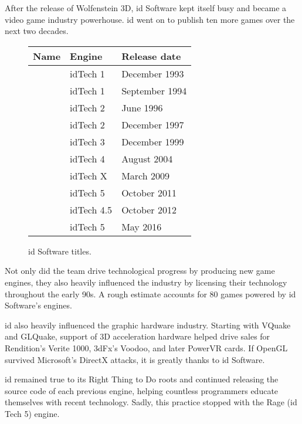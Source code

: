 After the release of Wolfenstein 3D, id Software kept itself busy and became a video game industry powerhouse. id went on to publish ten more games over the next two decades. 
 \begin{figure}[H]
\centering  
\begin{tabularx}{\textwidth}{ X  Y Y }
  \toprule
  \textbf{Name} & \textbf{Engine}  & \textbf{Release date} \\
  \toprule {} & idTech 1 & December 1993 \\ 
            & idTech 1 & September 1994 \\ 
            & idTech 2 &June 1996 \\ 
            & idTech 2 & December 1997 \\ 
            &  idTech 3 & December 1999 \\ 
            &  idTech 4 & August 2004 \\ 
            &  idTech X & March 2009 \\ 
            &  idTech 5 & October 2011 \\ 
            &  idTech 4.5\protect\footnotemark & October 2012 \\ 
            &  idTech 5 & May 2016 \\ 
  \toprule
\end{tabularx}
\caption{id Software titles.}\label{fig:vga_history}
\end{figure}
\par
{}
Not only did the team drive technological progress by producing new game engines, they also heavily influenced the industry by licensing their technology throughout the early 90s. A rough estimate accounts for 80 games powered by id Software's engines.\\
\par
id also heavily influenced the graphic hardware industry. Starting with VQuake and GLQuake, support of 3D acceleration hardware helped drive sales for Rendition's Verite 1000, 3dFx's Voodoo, and later PowerVR cards. If OpenGL survived Microsoft's DirectX attacks, it is greatly thanks to id Software.\\
\par
id remained true to its Right Thing to Do roots and continued releasing the source code of each previous engine, helping countless programmers educate themselves with recent technology. Sadly, this practice stopped with the Rage (id Tech 5) engine.\\
